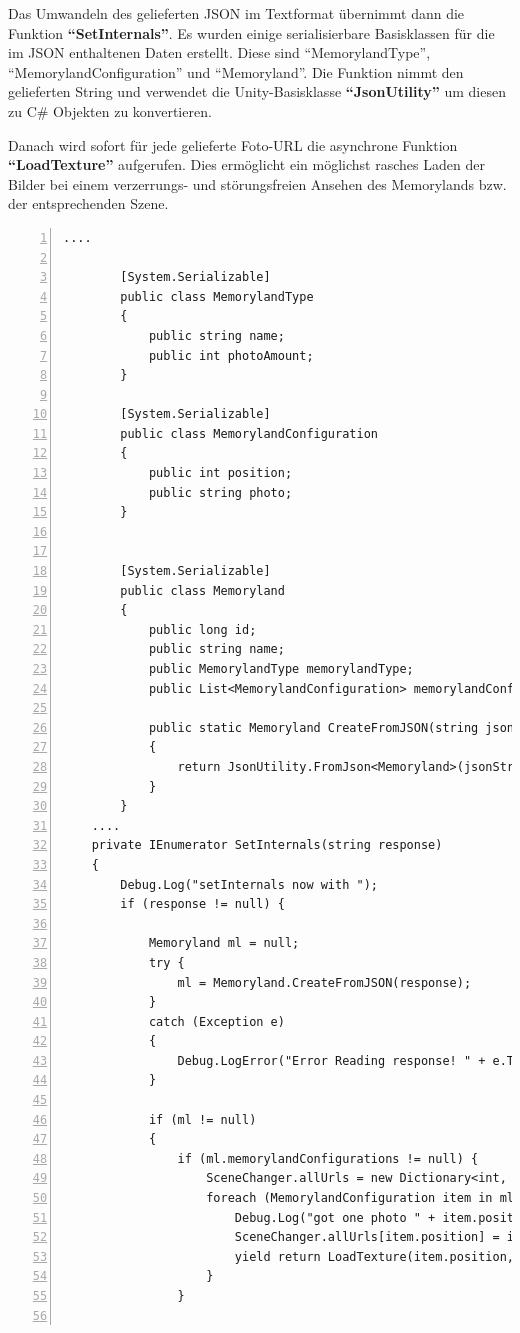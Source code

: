 Das Umwandeln des gelieferten JSON im Textformat übernimmt dann die Funktion \textbf{``SetInternals''}. Es wurden einige serialisierbare Basisklassen für die im JSON enthaltenen Daten erstellt. Diese sind ``MemorylandType'', ``MemorylandConfiguration'' und ``Memoryland''. Die Funktion nimmt den gelieferten String und verwendet die Unity-Basisklasse \textbf{``JsonUtility''} um diesen zu C\# Objekten zu konvertieren.

Danach wird sofort für jede gelieferte Foto-URL die asynchrone Funktion \textbf{``LoadTexture''} aufgerufen. Dies ermöglicht ein möglichst rasches Laden der Bilder bei einem verzerrungs- und störungsfreien Ansehen des Memorylands bzw. der entsprechenden Szene. 

\begin{lstlisting}[numbers=left,caption={SceneChanger - SetInternals},label={lst:unity-scene-changer-set-internals}]
    ....   
    
        [System.Serializable]
        public class MemorylandType
        {
            public string name;
            public int photoAmount;
        }
        
        [System.Serializable]
        public class MemorylandConfiguration
        {
            public int position;
            public string photo;
        }
        
        
        [System.Serializable]
        public class Memoryland
        {
            public long id;
            public string name;
            public MemorylandType memorylandType;
            public List<MemorylandConfiguration> memorylandConfigurations;
        
            public static Memoryland CreateFromJSON(string jsonString)
            {
                return JsonUtility.FromJson<Memoryland>(jsonString);
            }
        }
    ....
    private IEnumerator SetInternals(string response) 
    {
        Debug.Log("setInternals now with ");
        if (response != null) {
        
            Memoryland ml = null;
            try {
                ml = Memoryland.CreateFromJSON(response);
            }
            catch (Exception e)
            {
                Debug.LogError("Error Reading response! " + e.ToString());
            }
            
            if (ml != null) 
            {
                if (ml.memorylandConfigurations != null) {
                    SceneChanger.allUrls = new Dictionary<int, string>();
                    foreach (MemorylandConfiguration item in ml.memorylandConfigurations) {
                        Debug.Log("got one photo " + item.position.ToString());
                        SceneChanger.allUrls[item.position] = item.photo;
                        yield return LoadTexture(item.position, item.photo);
                    }
                }


\end{lstlisting}
